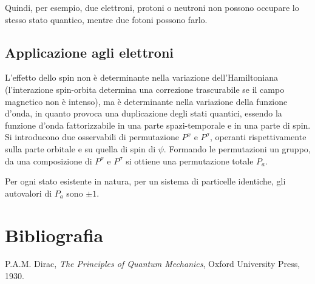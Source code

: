 \documentclass{article}
\begin{document}
Quindi, per esempio, due elettroni, protoni o neutroni non possono occupare lo stesso stato quantico, mentre due fotoni possono farlo.

\subsection*{Applicazione agli elettroni}
L'effetto dello spin non è determinante nella variazione dell'Hamiltoniana (l'interazione spin-orbita determina una correzione trascurabile se il campo
magnetico non è intenso), ma è determinante nella variazione della funzione d'onda, in quanto provoca una duplicazione degli stati quantici,
essendo la funzione d'onda fattorizzabile in una parte spazi-temporale e in una parte di spin.
Si introducono due osservabili di permutazione $P^x$ e $P^\sigma$, operanti rispettivamente sulla parte orbitale e su quella di spin di $\psi$.
Formando le permutazioni un gruppo, da una composizione di $P^x$ e $P^\sigma$ si ottiene una permutazione totale $P_a$.

Per ogni stato esistente in natura, per un sistema di particelle identiche, gli autovalori di $P_a$ sono $\pm 1$.




\section{Bibliografia}
\begin{thebibliography}{9}
     P.A.M. Dirac, \emph{The Principles of Quantum Mechanics}, Oxford University Press, 1930.
\end{thebibliography}
\end{document}

